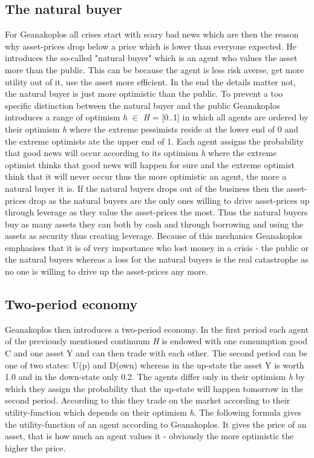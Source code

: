 \documentclass[../Bachelorarbeit.tex]{subfiles}
\begin{document}
\subsection{The natural buyer}
For Geanakoplos all crises start with scary bad news which are then the reason why asset-prices drop below a price which is lower than everyone expected. He introduces the so-called "natural buyer" which is an agent who values the asset more than the public. This can be because the agent is less risk averse, get more utility out of it, use the asset more efficient. In the end the details matter not, the natural buyer is just more optimistic than the public.
To prevent a too specific distinction between the natural buyer and the public Geanakoplos introduces a range of optimism \textit{h} $\in$ \textit{H} = [0..1] in which all agents are ordered by their optimism \textit{h} where the extreme pessimists reside at the lower end of 0 and the extreme optimists ate the upper end of 1. Each agent assigns the probability that good news will occur according to its optimism \textit{h} where the extreme optimist thinks that good news will happen for sure and the extreme optimist think that it will never occur thus the more optimistic an agent, the more a natural buyer it is. If the natural buyers drops out of the business then the asset-prices drop as the natural buyers are the only ones willing to drive asset-prices up through leverage as they value the asset-prices the most. Thus the natural buyers buy as many assets they can both by cash and through borrowing and using the assets as security thus creating leverage. Because of this mechanics Geanakoplos emphasises that it is of very importance who lost money in a crisis - the public or the natural buyers whereas a loss for the natural buyers is the real catastrophe as no one is willing to drive up the asset-prices any more.

\subsection{Two-period economy}
Geanakoplos then introduces a two-period economy. In the first period each agent of the previously mentioned continuum \textit{H} is endowed with one consumption good C and one asset Y and can then trade with each other. The second period can be one of two states: U(p) and D(own) whereas in the up-state the asset Y is worth 1.0 and in the down-state only 0.2. The agents differ only in their optimism \textit{h} by which they assign the probability that the up-state will happen tomorrow in the second period. According to this they trade on the market according to their utility-function which depends on their optimism \textit{h}. The following formula gives the utility-function of an agent according to Geanakoplos. It gives the price of an asset, that is how much an agent values it - obviously the more optimistic the higher the price.
\end{document}
